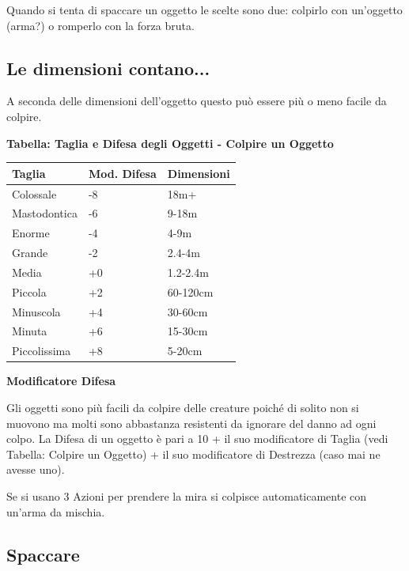 \begin{multicols}{2}

\label{sfondare-ed-entrare}

Quando si tenta di spaccare un oggetto le scelte sono due: colpirlo con un'oggetto (arma?) o romperlo con la forza bruta.

\smallskip

\subsection{Le dimensioni contano...}

A seconda delle dimensioni dell'oggetto questo può essere più o meno facile da colpire.

\medskip

\textbf{Tabella: Taglia e Difesa degli Oggetti - Colpire un Oggetto}

\medskip

\begin{tabularx}{0.43\textwidth}{lll}
\textbf{Taglia} & \textbf{Mod. Difesa} & \textbf{Dimensioni}\\
\toprule
Colossale & -8 &18m+\\
Mastodontica & -6 &9-18m\\
Enorme & -4 &4-9m\\
Grande & -2 &2.4-4m\\
Media & +0 &1.2-2.4m\\
Piccola & +2 &60-120cm\\
Minuscola & +4 &30-60cm\\
Minuta & +6 &15-30cm\\
Piccolissima & +8 &5-20cm
\end{tabularx}

\medskip

\textbf{Modificatore Difesa}

Gli oggetti sono più facili da colpire delle creature poiché di solito non si muovono ma molti sono abbastanza resistenti da ignorare del danno ad ogni colpo. La Difesa di un oggetto è pari a 10 + il suo modificatore di Taglia (vedi Tabella: Colpire un Oggetto) + il suo modificatore di Destrezza (caso mai ne avesse uno).

Se si usano 3 Azioni per prendere la mira si colpisce automaticamente con un'arma da mischia.

\subsection{Spaccare}


\end{multicols}
